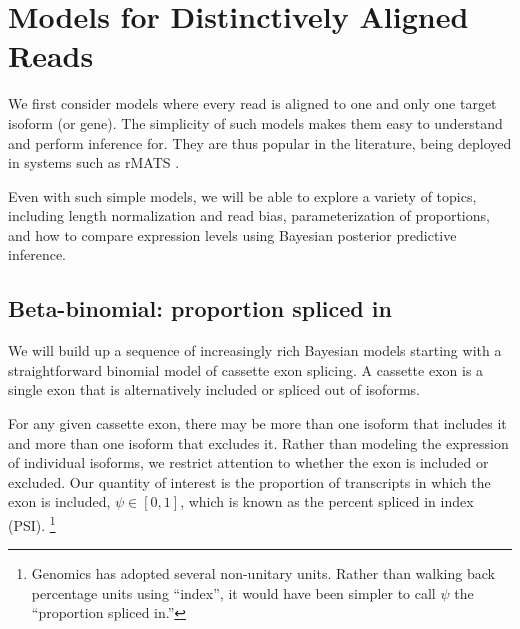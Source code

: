 \documentclass[11pt]{report}
\begin{document}
\chapter{Models for Distinctively Aligned Reads}

We first consider models where every read is aligned to one and only
one target isoform (or gene). The simplicity of such models makes them
easy to understand and perform inference for. They are thus popular in
the literature, being deployed in systems such as rMATS
\citep{shen2014rmats}.

Even with such simple models, we will be able to explore a variety of
topics, including length normalization and read bias, parameterization
of proportions, and how to compare expression levels using Bayesian
posterior predictive inference.


\section{Beta-binomial: proportion spliced in}

We will build up a sequence of increasingly rich Bayesian models
starting with a straightforward binomial model of cassette exon
splicing. A cassette exon is a single exon that is alternatively
included or spliced out of isoforms.

For any given cassette exon, there may be more than one isoform that
includes it and more than one isoform that excludes it. Rather than
modeling the expression of individual isoforms, we restrict attention
to whether the exon is included or excluded. Our quantity of interest
is the proportion of transcripts in which the exon is included,
$\psi \in [0, 1]$, which is known as the percent spliced in index
(PSI).%
\footnote{Genomics has adopted several non-unitary units.
  Rather than walking back percentage units using ``index'', it would
  have been simpler to call $\psi$ the ``proportion spliced in.''}
\end{document}
